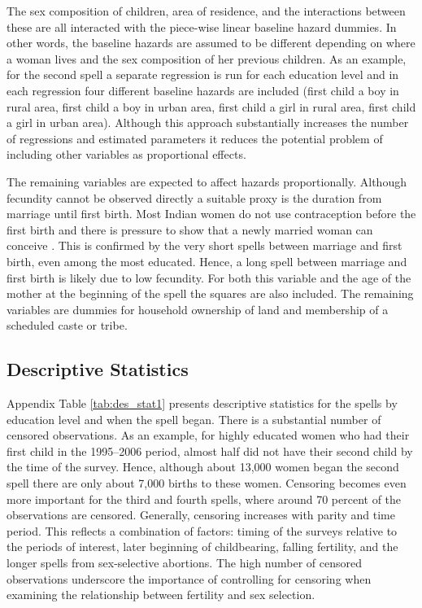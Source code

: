 \documentclass[12pt,letterpaper]{article}
\begin{document}
The sex composition of children, area of residence, and the interactions between
these are all interacted with the piece-wise linear baseline hazard dummies.
In other words, the baseline hazards are assumed to be different depending on
where a woman lives and the sex composition of her previous children.
As an example, for the second spell a separate regression is
run for each education level and in each regression four different baseline hazards 
are included (first child a boy in rural area, first child a boy in urban area,
first child a girl in rural area, first child a girl in urban area).
Although this approach substantially increases the number of regressions and 
estimated parameters it reduces the potential problem of including other variables 
as proportional effects.

The remaining variables are expected to affect hazards proportionally.
Although fecundity cannot be observed directly a suitable
proxy is the duration from marriage until first birth.
Most Indian women do not use contraception before the first birth
and there is pressure to show that a newly married woman can conceive 
\citep{dyson83,Sethuraman2007,Dommaraju2009}.
This is confirmed by the very short spells between marriage and first birth,
even among the most educated.
Hence, a long spell between marriage and first birth is likely due to low fecundity.
For both this variable and the age of the mother at the beginning of the spell 
the squares are also included.
The remaining variables are dummies for household ownership of land and membership
of a scheduled caste or tribe.


\subsection{Descriptive Statistics}

Appendix Table \ref{tab:des_stat1} presents descriptive statistics for
the spells by education level and when the spell began.
There is a substantial number of censored observations.
As an example, for highly educated women who had their first child in the 1995--2006
period, almost half did not have their second child by the time of the survey.
Hence, although about 13,000 women began the second spell 
there are only about 7,000 births to these women.
Censoring becomes even more important for the third and fourth
spells, where around 70 percent of the observations are censored.
Generally, censoring increases with parity and time period.
This reflects a combination of factors: timing of the surveys
relative to the periods of interest, later beginning of childbearing, 
falling fertility, and the longer spells from sex-selective abortions.
The high number of censored observations underscore the importance of controlling for
censoring when examining the relationship between fertility and sex selection.
\end{document}
